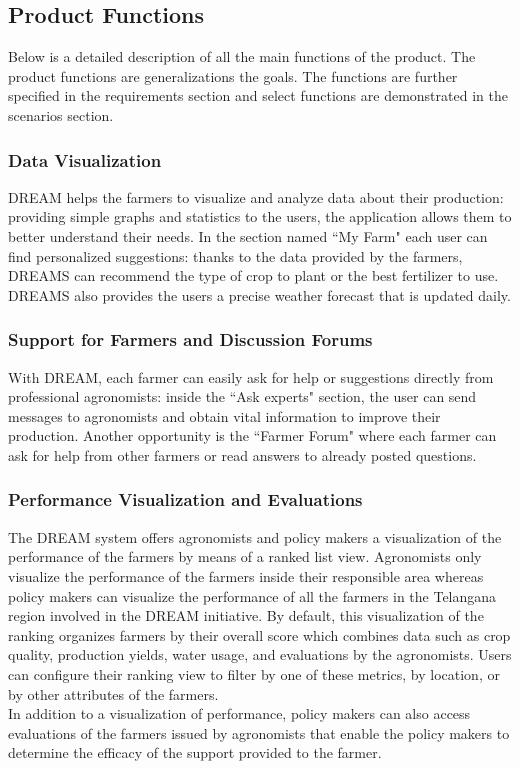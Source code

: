 \subsection{Product Functions}
\begin{flushleft}

Below is a detailed description of all the main functions of the product. The product functions are generalizations the goals. The functions are further specified in the requirements section and select functions are demonstrated in the scenarios section. 

\subsubsection{Data Visualization}
DREAM helps the farmers to visualize and analyze data about their production: providing simple graphs and statistics to the users, the application allows them to better understand their needs. In the section named “My Farm" each user can find personalized suggestions: thanks to the data provided by the farmers, DREAMS can recommend the type of crop to plant or the best fertilizer to use. DREAMS also provides the users a precise weather forecast that is updated daily.

\subsubsection{Support for Farmers and Discussion Forums}
With DREAM, each farmer can easily ask for help or suggestions directly from professional agronomists: inside the “Ask experts" section, the user can send messages to agronomists and obtain vital information to improve their production. Another opportunity is the “Farmer Forum" where each farmer can ask for help from other farmers or read answers to already posted questions.

\subsubsection{Performance Visualization and Evaluations}
The DREAM system offers agronomists and policy makers a visualization of the performance of the farmers by means of a ranked list view. Agronomists only visualize the performance of the farmers inside their responsible area whereas policy makers can visualize the performance of all the farmers in the Telangana region involved in the DREAM initiative. By default, this visualization of the ranking organizes farmers by their overall score which combines data such as crop quality, production yields, water usage, and evaluations by the agronomists. Users can configure their ranking view to filter by one of these metrics, by location, or by other attributes of the farmers. \\
\smallskip
In addition to a visualization of performance, policy makers can also access evaluations of the farmers issued by agronomists that enable the policy makers to determine the efficacy of the support provided to the farmer. 


\end{flushleft}
